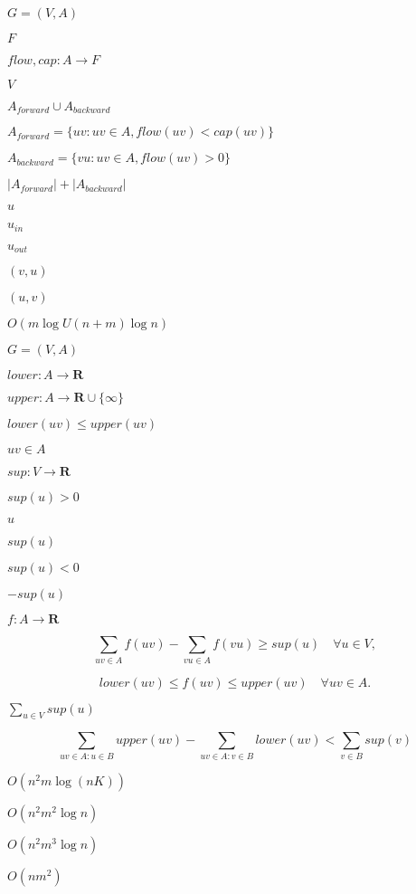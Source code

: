 \documentclass{article}
\begin{document}
$ G=(V, A) $
\pagebreak

$ F $
\pagebreak

$ flow, cap: A\to F $
\pagebreak

$ V $
\pagebreak

$ A_{forward}\cup A_{backward} $
\pagebreak

$ A_{forward}=\{uv : uv\in A, flow(uv)<cap(uv)\} $
\pagebreak

$ A_{backward}=\{vu : uv\in A, flow(uv)>0\} $
\pagebreak

$ |A_{forward}| + |A_{backward}|$
\pagebreak

$ u $
\pagebreak

$ u_{in} $
\pagebreak

$ u_{out} $
\pagebreak

$ (v, u) $
\pagebreak

$ (u, v) $
\pagebreak

$O(m\log U (n+m)\log n)$
\pagebreak

$G=(V,A)$
\pagebreak

$lower: A\rightarrow\mathbf{R}$
\pagebreak

$upper: A\rightarrow\mathbf{R}\cup\{\infty\}$
\pagebreak

$lower(uv) \leq upper(uv)$
\pagebreak

$uv\in A$
\pagebreak

$sup: V\rightarrow\mathbf{R}$
\pagebreak

$sup(u)>0$
\pagebreak

$u$
\pagebreak

$sup(u)$
\pagebreak

$sup(u)<0$
\pagebreak

$-sup(u)$
\pagebreak

$f: A\rightarrow\mathbf{R}$
\pagebreak

\[ \sum_{uv\in A} f(uv) - \sum_{vu\in A} f(vu)
\geq sup(u) \quad \forall u\in V, \]
\pagebreak

\[ lower(uv) \leq f(uv) \leq upper(uv) \quad \forall uv\in A. \]
\pagebreak

$\sum_{u\in V} sup(u)$
\pagebreak

\[ \sum_{uv\in A: u\in B} upper(uv) -
    \sum_{uv\in A: v\in B} lower(uv) < \sum_{v\in B} sup(v) \]
\pagebreak

$O(n^2m\log(nK))$
\pagebreak

$O(n^2 m^2 \log n)$
\pagebreak

$O(n^2 m^3 \log n)$
\pagebreak

$ O(nm^2) $
\pagebreak
\end{document}
